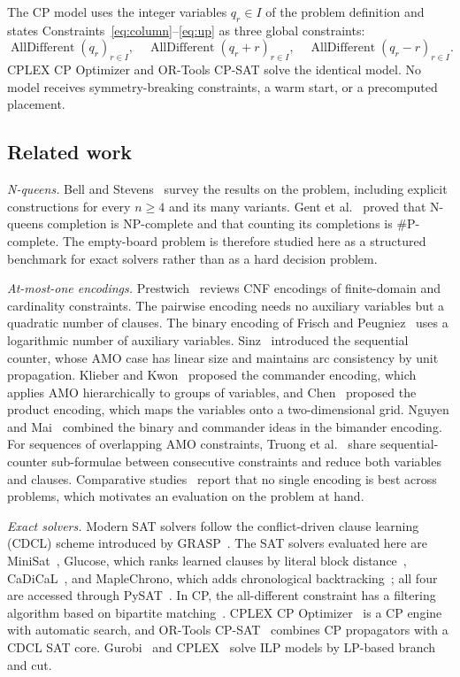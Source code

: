 \documentclass[a4paper,fleqn]{cas-sc}
\begin{document}
The CP model uses the integer variables $q_r\in I$ of the problem
definition and states Constraints~\eqref{eq:column}--\eqref{eq:up} as
three global constraints:
\begin{equation}
\operatorname{AllDifferent}(q_r)_{r\in I},\quad
\operatorname{AllDifferent}(q_r+r)_{r\in I},\quad
\operatorname{AllDifferent}(q_r-r)_{r\in I}.
\end{equation}
CPLEX CP Optimizer and OR-Tools CP-SAT solve the identical model.
No model receives symmetry-breaking constraints, a warm start, or a
precomputed placement.

\subsection{Related work}
\textit{N-queens.} Bell and Stevens~\cite{bell} survey the results on the
problem, including explicit constructions for every $n\ge4$ and its many
variants. Gent et al.~\cite{gent} proved that N-queens completion is
NP-complete and that counting its completions is \#P-complete. The
empty-board problem is therefore studied here as a structured benchmark
for exact solvers rather than as a hard decision problem.

\textit{At-most-one encodings.} Prestwich~\cite{prestwich} reviews CNF
encodings of finite-domain and cardinality constraints. The pairwise
encoding needs no auxiliary variables but a quadratic number of clauses.
The binary encoding of Frisch and Peugniez~\cite{frischbinary} uses a
logarithmic number of auxiliary variables. Sinz~\cite{sinz} introduced
the sequential counter, whose AMO case has linear size and maintains arc
consistency by unit propagation. Klieber and Kwon~\cite{commander}
proposed the commander encoding, which applies AMO hierarchically to
groups of variables, and Chen~\cite{product} proposed the product
encoding, which maps the variables onto a two-dimensional grid. Nguyen
and Mai~\cite{nguyenmai} combined the binary and commander ideas in the
bimander encoding. For sequences of overlapping AMO constraints, Truong
et al.~\cite{staircase} share sequential-counter sub-formulae between
consecutive constraints and reduce both variables and clauses. Comparative
studies~\cite{frischamok} report that no single encoding is best across
problems, which motivates an evaluation on the problem at hand.

\textit{Exact solvers.} Modern SAT solvers follow the conflict-driven
clause learning (CDCL) scheme introduced by GRASP~\cite{grasp}. The SAT
solvers evaluated here are MiniSat~\cite{minisat}, Glucose, which ranks
learned clauses by literal block distance~\cite{glucose},
CaDiCaL~\cite{cadical}, and MapleChrono, which adds chronological
backtracking~\cite{chrono}; all four are accessed through
PySAT~\cite{pysat}. In CP, the all-different constraint has a filtering
algorithm based on bipartite matching~\cite{regin}. CPLEX CP
Optimizer~\cite{cpoptimizer} is a CP engine with automatic search, and
OR-Tools CP-SAT~\cite{cpsat} combines CP propagators with a CDCL SAT core.
Gurobi~\cite{gurobi} and CPLEX~\cite{cplex} solve ILP models by LP-based
branch and cut.
\end{document}
